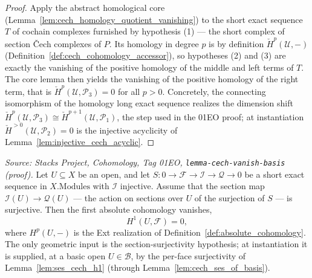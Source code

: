 \begin{proof}
  \leanok
  Apply the abstract homological core (Lemma~\ref{lem:cech_homology_quotient_vanishing}) to the
  short exact sequence \(T\) of cochain complexes furnished by hypothesis (1) — the short complex of
  section {\v C}ech complexes of \(P\). Its homology in degree \(p\) is by definition
  \(\check{H}^p(\mathcal{U}, -)\) (Definition~\ref{def:cech_cohomology_accessor}), so hypotheses (2)
  and (3) are exactly the vanishing of the positive homology of the middle and left terms of \(T\).
  The core lemma then yields the vanishing of the positive homology of the right term, that is
  \(\check{H}^p(\mathcal{U}, \mathcal{P}_3) = 0\) for all \(p > 0\). Concretely, the connecting
  isomorphism of the homology long exact sequence realizes the dimension shift
  \(\check{H}^p(\mathcal{U}, \mathcal{P}_3) \cong \check{H}^{p+1}(\mathcal{U}, \mathcal{P}_1)\), the
  step used in the 01EO proof; at instantiation \(\check{H}^{>0}(\mathcal{U}, \mathcal{P}_2) = 0\) is
  the injective acyclicity of Lemma~\ref{lem:injective_cech_acyclic}.
\end{proof}

\begin{lemma}[Sheaf-cohomology base case \(H^1(U, \mathcal{F}) = 0\)]\leanok
  \label{lem:absolute_cohomology_one_vanishing}
  \textit{Source: Stacks Project, Cohomology, Tag 01EO,
  \texttt{lemma-cech-vanish-basis} (proof).}
  Let \(U \subseteq X\) be an open, and let
  \(S : 0 \to \mathcal{F} \to \mathcal{I} \to \mathcal{Q} \to 0\) be a short exact sequence in
  \(X.\mathrm{Modules}\) with \(\mathcal{I}\) injective. Assume that the section map
  \(\mathcal{I}(U) \to \mathcal{Q}(U)\) — the action on sections over \(U\) of the surjection of
  \(S\) — is surjective. Then the first absolute cohomology vanishes,
  \[
    H^1(U, \mathcal{F}) = 0,
  \]
  where \(H^p(U, -)\) is the Ext realization of Definition~\ref{def:absolute_cohomology}. The only
  geometric input is the section-surjectivity hypothesis; at instantiation it is supplied, at a basic
  open \(U \in \mathcal{B}\), by the per-face surjectivity of Lemma~\ref{lem:ses_cech_h1} (through
  Lemma~\ref{lem:cech_ses_of_basis}).
\end{lemma}

